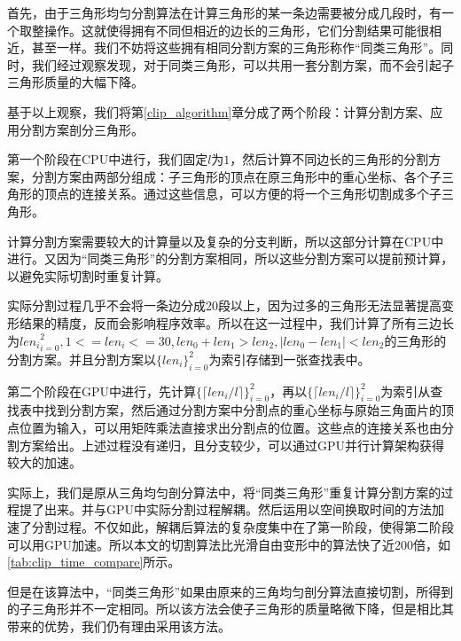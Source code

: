 首先，由于三角形均匀分割算法在计算三角形的某一条边需要被分成几段时，有一个取整操作。这就使得拥有不同但相近的边长的三角形，它们分割结果可能很相近，甚至一样。我们不妨将这些拥有相同分割方案的三角形称作“同类三角形”。同时，我们经过观察发现，对于同类三角形，可以共用一套分割方案，而不会引起子三角形质量的大幅下降。

基于以上观察，我们将第\autoref{clip_algorithm}章分成了两个阶段：计算分割方案、应用分割方案剖分三角形。


第一个阶段在CPU中进行，我们固定$l$为$1$，然后计算不同边长的三角形的分割方案，分割方案由两部分组成：子三角形的顶点在原三角形中的重心坐标、各个子三角形的顶点的连接关系。通过这些信息，可以方便的将一个三角形切割成多个子三角形。

计算分割方案需要较大的计算量以及复杂的分支判断，所以这部分计算在CPU中进行。又因为“同类三角形”的分割方案相同，所以这些分割方案可以提前预计算，以避免实际切割时重复计算。

实际分割过程几乎不会将一条边分成20段以上，因为过多的三角形无法显著提高变形结果的精度，反而会影响程序效率。所以在这一过程中，我们计算了所有三边长为${len_i}^{2}_{i=0}, 1 <= len_i <= 30, len_0 + len_1 > len_2, |len_0 - len_1| < len_2$的三角形的分割方案。并且分割方案以$\{len_i\}^{2}_{i=0}$为索引存储到一张查找表中。


第二个阶段在GPU中进行，先计算$\{\lceil len_i/l \rceil\}^{2}_{i=0}$，再以$\{\lceil len_i/l \rceil\}^{2}_{i=0}$为索引从查找表中找到分割方案，然后通过分割方案中分割点的重心坐标与原始三角面片的顶点位置为输入，可以用矩阵乘法直接求出分割点的位置。这些点的连接关系也由分割方案给出。上述过程没有递归，且分支较少，可以通过GPU并行计算架构获得较大的加速。

实际上，我们是原从三角均匀剖分算法中，将“同类三角形”重复计算分割方案的过程提了出来。并与GPU中实际分割过程解耦。然后运用以空间换取时间的方法加速了分割过程。不仅如此，解耦后算法的复杂度集中在了第一阶段，使得第二阶段可以用GPU加速。所以本文的切割算法比光滑自由变形中的算法快了近200倍，如\autoref{tab:clip_time_compare}所示。


但是在该算法中，“同类三角形”如果由原来的三角均匀剖分算法直接切割，所得到的子三角形并不一定相同。所以该方法会使子三角形的质量略微下降，但是相比其带来的优势，我们仍有理由采用该方法。
